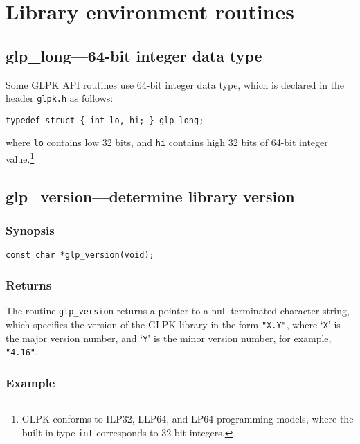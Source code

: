 \newpage

\section{Library environment routines}

\subsection{glp\_long---64-bit integer data type}

Some GLPK API routines use 64-bit integer data type, which is declared
in the header \verb|glpk.h| as follows:

\begin{verbatim}
typedef struct { int lo, hi; } glp_long;
\end{verbatim}

\noindent
where \verb|lo| contains low 32 bits, and \verb|hi| contains high 32
bits of 64-bit integer value.\footnote{GLPK conforms to ILP32, LLP64,
and LP64 programming models, where the built-in type {\tt int}
corresponds to 32-bit integers.}

\subsection{glp\_version---determine library version}

\subsubsection*{Synopsis}

\begin{verbatim}
const char *glp_version(void);
\end{verbatim}

\subsubsection*{Returns}

The routine \verb|glp_version| returns a pointer to a null-terminated
character string, which specifies the version of the GLPK library in
the form \verb|"X.Y"|, where `\verb|X|' is the major version number, and
`\verb|Y|' is the minor version number, for example, \verb|"4.16"|.

\subsubsection*{Example}


